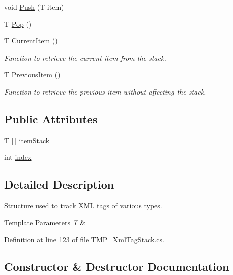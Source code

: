 \begin{DoxyCompactItemize}
void \mbox{\hyperlink{struct_t_m_pro_1_1_t_m_p___xml_tag_stack_a4d8f0cc65ddab2c5b902c2afe4d4e3c8}{Push}} (T item)
\item 
T \mbox{\hyperlink{struct_t_m_pro_1_1_t_m_p___xml_tag_stack_a5d638de23cccb39bfb43391466559628}{Pop}} ()
\item 
T \mbox{\hyperlink{struct_t_m_pro_1_1_t_m_p___xml_tag_stack_ad2d0ec4ced3b5e0e1cf97b2fe91f4957}{Current\+Item}} ()
\begin{DoxyCompactList}\small\item\em Function to retrieve the current item from the stack. \end{DoxyCompactList}\item 
T \mbox{\hyperlink{struct_t_m_pro_1_1_t_m_p___xml_tag_stack_a3ccea15c0ddf654ce5dd5c186a2d8afc}{Previous\+Item}} ()
\begin{DoxyCompactList}\small\item\em Function to retrieve the previous item without affecting the stack. \end{DoxyCompactList}\end{DoxyCompactItemize}
\subsection*{Public Attributes}
\begin{DoxyCompactItemize}
\item 
T \mbox{[}$\,$\mbox{]} \mbox{\hyperlink{struct_t_m_pro_1_1_t_m_p___xml_tag_stack_ae62de73842140b895d45c09ffe3a36ee}{item\+Stack}}
\item 
int \mbox{\hyperlink{struct_t_m_pro_1_1_t_m_p___xml_tag_stack_a86973ba411e6666b64578385fa858f1e}{index}}
\end{DoxyCompactItemize}


\subsection{Detailed Description}
Structure used to track X\+ML tags of various types. 


\begin{DoxyTemplParams}{Template Parameters}
{\em T} & \\
\hline
\end{DoxyTemplParams}


Definition at line 123 of file T\+M\+P\+\_\+\+Xml\+Tag\+Stack.\+cs.



\subsection{Constructor \& Destructor Documentation}
\mbox{\label{struct_t_m_pro_1_1_t_m_p___xml_tag_stack_ac4cb25bb25d021c5422260abb637d03c}} 
